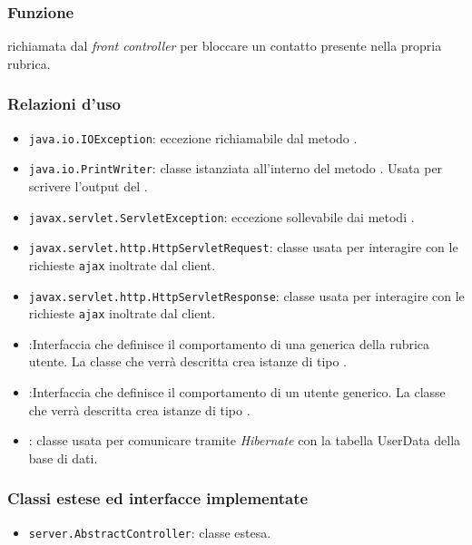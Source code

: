 

\subsubsection*{Funzione}
 richiamata dal \textit{front controller} per bloccare un contatto presente nella propria rubrica.

\subsubsection*{Relazioni d'uso}

\begin{itemize}
	\item \texttt{java.io.IOException}: eccezione richiamabile dal metodo .
	\item \texttt{java.io.PrintWriter}: classe istanziata all'interno del metodo . Usata per scrivere l'output del .
	\item \texttt{javax.servlet.ServletException}: eccezione sollevabile dai metodi .
	\item \texttt{javax.servlet.http.HttpServletRequest}: classe usata per interagire con le richieste \texttt{ajax} inoltrate dal client.
	\item \texttt{javax.servlet.http.HttpServletResponse}: classe usata per interagire con le richieste \texttt{ajax} inoltrate dal client.
	\item {}:Interfaccia che definisce il comportamento di una generica  della rubrica utente. La classe che verrà descritta crea istanze di tipo .
	\item {}:Interfaccia che definisce il comportamento di un utente generico. La classe che verrà descritta crea istanze di tipo .
	\item {}: classe usata per comunicare tramite \textit{Hibernate} con la tabella UserData della base di dati.
\end{itemize}

\subsubsection*{Classi estese ed interfacce implementate}
\begin{itemize}
	\item \texttt{server.AbstractController}: classe estesa.
\end{itemize}

